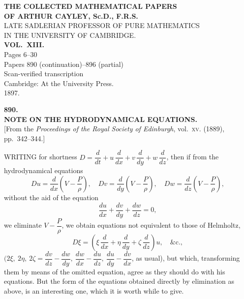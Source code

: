 \documentclass[11pt,a4paper]{article}
\begin{document}
\thispagestyle{empty}
\begin{center}
\vspace*{2cm}
{\LARGE\bfseries THE COLLECTED MATHEMATICAL PAPERS\\[0.5em] OF ARTHUR CAYLEY, Sc.D., F.R.S.\\[1em]}
{\Large LATE SADLERIAN PROFESSOR OF PURE MATHEMATICS\\ IN THE UNIVERSITY OF CAMBRIDGE.\\[2em]}
{\LARGE\bfseries VOL.\ XIII.\\[2em]}
{\large Pages 6--30\\[0.5em] Papers 890 (continuation)--896 (partial)\\[2em]}
{\large Scan-verified transcription\\[3em]}
\vfill
{\large Cambridge: At the University Press.\\ 1897.\\[1em]}
\end{center}
\clearpage

\setcounter{page}{6}

\begin{center}
{\large\bfseries 890.}\\[0.5em]
{\large\bfseries NOTE ON THE HYDRODYNAMICAL EQUATIONS.}\\[0.5em]
\small [From the \emph{Proceedings of the Royal Society of Edinburgh}, vol.\ \textsc{xv}. (1889), pp.\ 342--344.]
\end{center}
\medskip

WRITING for shortness $D = \dfrac{d}{dt} + u\,\dfrac{d}{dx} + v\,\dfrac{d}{dy} + w\,\dfrac{d}{dz}$, then if from the hydrodynamical equations
\[
Du = \frac{d}{dx}\!\left(V - \frac{P}{\rho}\right),\quad Dv = \frac{d}{dy}\!\left(V - \frac{P}{\rho}\right),\quad Dw = \frac{d}{dz}\!\left(V - \frac{P}{\rho}\right),
\]
without the aid of the equation
\[
\frac{du}{dx} + \frac{dv}{dy} + \frac{dw}{dz} = 0,
\]
we eliminate $V - \dfrac{P}{\rho}$, we obtain equations not equivalent to those of Helmholtz,
\[
D\xi = \left(\xi\,\frac{d}{dx} + \eta\,\frac{d}{dy} + \zeta\,\frac{d}{dz}\right)u, \quad \&\text{c}.,
\]
$(2\xi,\ 2\eta,\ 2\zeta = \dfrac{dv}{dz} - \dfrac{dw}{dy},\ \dfrac{dw}{dx} - \dfrac{du}{dz},\ \dfrac{du}{dy} - \dfrac{dv}{dx}$, as usual), but which, transforming them by means of the omitted equation, agree as they should do with his equations. But the form of the equations obtained directly by elimination as above, is an interesting one, which it is worth while to give.
\end{document}
